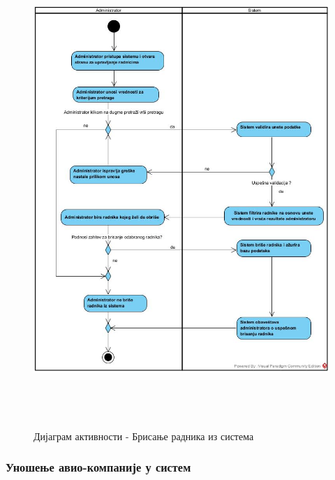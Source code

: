 \documentclass{article}
\begin{document}
\begin{figure}[H]
    \centering
    \includegraphics[width=1.1\textwidth, height=18cm]{Dijagrami_slike/brisanje_radnika.jpg}
    \caption{Дијаграм активности - Брисање радника из система}
\end{figure}


\subsubsection{Уношење авио-компаније у систем}
\end{document}
